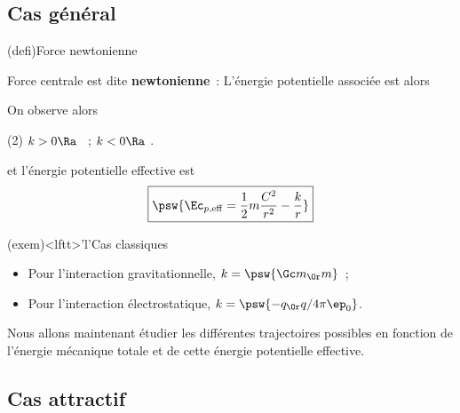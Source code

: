 \documentclass[../../main/main.tex]{subfiles}
\begin{document}
\subsection{Cas général}
\begin{tcb*}(defi){Force newtonienne}
  \begin{isd}
    Force centrale est dite \textbf{newtonienne}~:
    \psw{
      \[\boxed{\Ff = -\frac{k}{r^2}\ur}\]
    }
    \vspace{-15pt}
    \tcblower
    L'énergie potentielle associée est alors
    \psw{\[\boxed{\Ec_p(r) = -\frac{k}{r}}\]}
    \vspace{-15pt}
  \end{isd}
  On observe alors
  \begin{tasks}[label=$\diamond$](2)
    \task $k>0 \Ra$ ~;
    \task $k<0 \Ra$ .
  \end{tasks}
  et l'énergie potentielle effective est
\[\boxed{\psw{\Ec_{p,\rm eff} = \frac{1}{2}m\frac{C^2}{r^2} - \frac{k}{r}}}\]
\end{tcb*}

\begin{tcb*}(exem)<lftt>'l'{Cas classiques}
	\begin{itemize}
		\item Pour l'interaction gravitationnelle, $k = \psw{\Gc m_\Or m}$~;
		\item Pour l'interaction électrostatique, $k = \psw{-q_\Or q/4\pi\ep_0}$.
	\end{itemize}
\end{tcb*}

Nous allons maintenant étudier les différentes trajectoires possibles en
fonction de l'énergie mécanique totale et de cette énergie potentielle
effective.

\subsection{Cas attractif}
\end{document}
